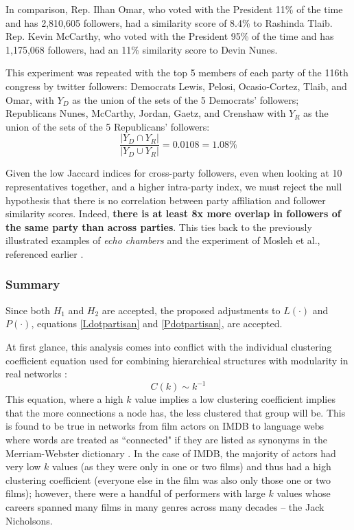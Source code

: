 \documentclass[preprint,review,12pt]{elsarticle}
\begin{document}
In comparison, Rep. Ilhan Omar, who voted with the President 11\% of the time and has 2,810,605 followers, had a similarity score of 8.4\% to Rashinda Tlaib. Rep. Kevin McCarthy, who voted with the President 95\% of the time and has 1,175,068 followers, had an 11\% similarity score to Devin Nunes.

This experiment was repeated with the top 5 members of each party of the 116th congress by twitter followers: Democrats Lewis, Pelosi, Ocasio-Cortez, Tlaib, and Omar, with $Y_D$ as the union of the sets of the 5 Democrats' followers; Republicans Nunes, McCarthy, Jordan, Gaetz, and Crenshaw with $Y_R$ as the union of the sets of the 5 Republicans' followers:
\begin{equation}
\label{party overlap twitter}
    \frac{|Y_D \cap Y_R|}{|Y_D \cup Y_R|} = 0.0108 = 1.08\%
\end{equation}

Given the low Jaccard indices for cross-party followers, even when looking at 10 representatives together, and a higher intra-party index, we must reject the null hypothesis that there is no correlation between party affiliation and follower similarity scores. Indeed, \textbf{there is at least 8x more overlap in followers of the same party than across parties}. This ties back to the previously illustrated examples of \textit{echo chambers} and the experiment of Mosleh et al., referenced earlier \cite{mosleh2020shared}.

\subsubsection{Summary}
\label{sec: P dot summary}
Since both $H_1$ and $H_2$ are accepted, the proposed adjustments to $L(\cdot)$ and $P(\cdot)$, equations \ref{Ldotpartisan} and \ref{Pdotpartisan}, are accepted.

At first glance, this analysis comes into conflict with the individual clustering coefficient equation used for combining hierarchical structures with modularity in real networks \cite{ravasz2003hierarchical,dorogovtsev2008critical,dorogovtsev2002pseudofractal}:
\begin{equation}
\label{hierarchy equation}
    C(k) \sim k^{-1}
\end{equation}
This equation, where a high $k$ value implies a low clustering coefficient implies that the more connections a node has, the less clustered that group will be. This is found to be true in networks from film actors on IMDB \cite{amaral2000classes,albert2000topology,barabasi1999emergence} to language webs where words are treated as ``connected" if they are listed as synonyms in the Merriam-Webster dictionary \cite{sole2001small,yook2002modeling,sigman2002global,dorogovtsev2001language}. In the case of IMDB, the majority of actors had very low $k$ values (as they were only in one or two films) and thus had a high clustering coefficient (everyone else in the film was also only those one or two films); however, there were a handful of performers with large $k$ values whose careers spanned many films in many genres across many decades -- the Jack Nicholsons. 
\end{document}
